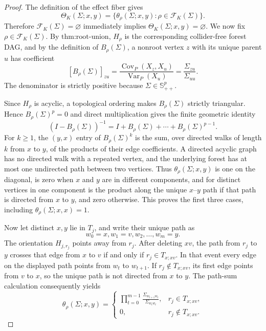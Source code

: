 \documentclass{article}
\begin{document}
\begin{proof}
The definition of the effect fiber gives
\[
 \Theta_K(\Sigma;x,y)
 =\{\theta_\rho(\Sigma;x,y):\rho\in\mathcal F_K(\Sigma)\}.
\]
Therefore \(\mathcal F_K(\Sigma)=\varnothing\) immediately implies \(\Theta_K(\Sigma;x,y)=\varnothing\). We now fix \(\rho\in\mathcal F_K(\Sigma)\). By \(\text{thm:root-union}\), \(H_\rho\) is the corresponding collider-free forest DAG, and by the definition of \(B_\rho(\Sigma)\), a nonroot vertex \(z\) with its unique parent \(u\) has coefficient
\[
 [B_\rho(\Sigma)]_{zu}
 =\frac{\operatorname{Cov}_P(X_z,X_u)}{\operatorname{Var}_P(X_u)}
 =\frac{\Sigma_{zu}}{\Sigma_{uu}}.
\]
The denominator is strictly positive because \(\Sigma\in\mathbb S_{++}^{p}\).

Since \(H_\rho\) is acyclic, a topological ordering makes \(B_\rho(\Sigma)\) strictly triangular. Hence \(B_\rho(\Sigma)^p=0\) and direct multiplication gives the finite geometric identity
\[
 (I-B_\rho(\Sigma))^{-1}
 =I+B_\rho(\Sigma)+\cdots+B_\rho(\Sigma)^{p-1}.
\]
For \(k\geq1\), the \((y,x)\) entry of \(B_\rho(\Sigma)^k\) is the sum, over directed walks of length \(k\) from \(x\) to \(y\), of the products of their edge coefficients. A directed acyclic graph has no directed walk with a repeated vertex, and the underlying forest has at most one undirected path between two vertices. Thus \(\theta_\rho(\Sigma;x,y)\) is one on the diagonal, is zero when \(x\) and \(y\) are in different components, and for distinct vertices in one component is the product along the unique \(x\)--\(y\) path if that path is directed from \(x\) to \(y\), and zero otherwise. This proves the first three cases, including \(\theta_\rho(\Sigma;x,x)=1\).

Now let distinct \(x,y\) lie in \(T_j\), and write their unique path as
\[
 w_0=x,w_1=v,w_2,\ldots,w_m=y.
\]
The orientation \(H_{j,r_j}\) points away from \(r_j\). After deleting \(xv\), the path from \(r_j\) to \(y\) crosses that edge from \(x\) to \(v\) if and only if \(r_j\in T_{x;xv}\). In that event every edge on the displayed path points from \(w_t\) to \(w_{t+1}\). If \(r_j\notin T_{x;xv}\), its first edge points from \(v\) to \(x\), so the unique path is not directed from \(x\) to \(y\). The path-sum calculation consequently yields
\[
 \theta_\rho(\Sigma;x,y)
 =\begin{cases}
 \displaystyle\prod_{t=0}^{m-1}
 \frac{\Sigma_{w_{t+1}w_t}}{\Sigma_{w_tw_t}},
 &r_j\in T_{x;xv},\\[3mm]
 0,&r_j\notin T_{x;xv}.
 \end{cases}
\]


\end{proof}
\end{document}
